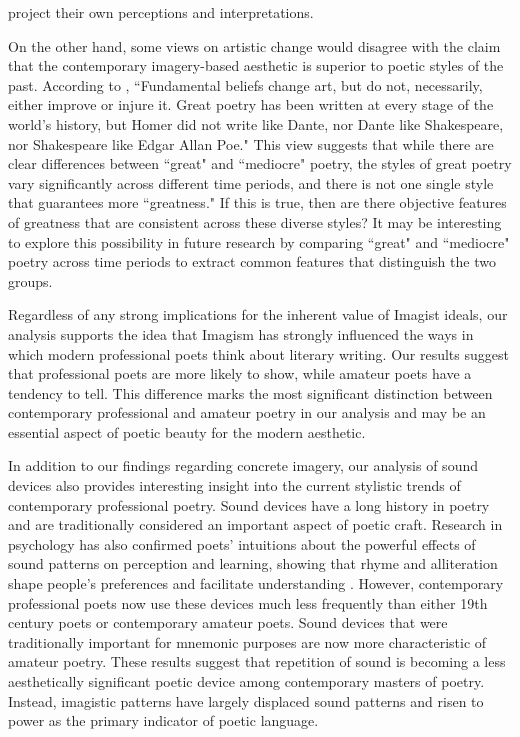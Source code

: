 \documentclass{book}
\begin{document}
project their own perceptions and interpretations.

On the other hand, some views on artistic change would disagree with the claim that the contemporary imagery-based aesthetic is superior to poetic styles of the past. According to \cite{lowell1920tendencies}, ``Fundamental beliefs change art, but do not, necessarily, either improve or injure it. Great poetry has been written at every stage of the world's history, but Homer did not write like Dante, nor Dante like Shakespeare, nor Shakespeare like Edgar Allan Poe." This view suggests that while there are clear differences between ``great" and ``mediocre" poetry, the styles of great poetry vary significantly across different time periods, and there is not one single style that guarantees more ``greatness." If this is true, then are there objective features of greatness that are consistent across these diverse styles? It may be interesting to explore this possibility in future research by comparing ``great" and ``mediocre" poetry across time periods to extract common features that distinguish the two groups.

Regardless of any strong implications for the inherent value of Imagist ideals, our analysis supports the idea that Imagism has strongly influenced the ways in which modern professional poets think about literary writing. Our results suggest that professional poets are more likely to show, while amateur poets have a tendency to tell. This difference marks the most significant distinction between contemporary professional and amateur poetry in our analysis and may be an essential aspect of poetic beauty for the modern aesthetic.

In addition to our findings regarding concrete imagery, our analysis of sound devices also provides interesting insight into the current stylistic trends of contemporary professional poetry. Sound devices have a long history in poetry and are traditionally considered an important aspect of poetic craft. Research in psychology has also confirmed poets' intuitions about the powerful effects of sound patterns on perception and learning, showing that rhyme and   alliteration shape people's preferences and facilitate understanding \citep{aphorisms, reading}. However, contemporary professional poets now use these devices much less frequently than either 19th century poets or contemporary amateur poets. Sound devices that were traditionally important for mnemonic purposes are now more characteristic of amateur poetry. These results suggest that repetition of sound is becoming a less aesthetically significant poetic device among contemporary masters of poetry. Instead, imagistic patterns have largely displaced sound patterns and risen to power as the primary indicator of poetic language. 
\end{document}
